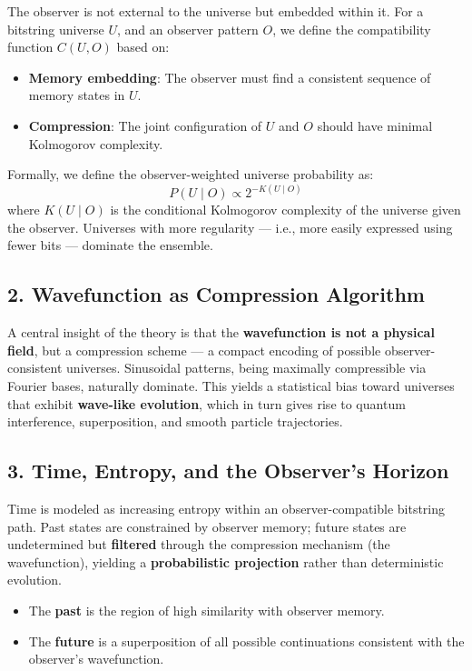 \documentclass[11pt]{article}
\begin{document}
The observer is not external to the universe but embedded within it. For a bitstring universe $U$, and an observer pattern $O$, we define the compatibility function $C(U, O)$ based on:

\begin{itemize}
      \item \textbf{Memory embedding}: The observer must find a consistent sequence of memory states in $U$.
      \item \textbf{Compression}: The joint configuration of $U$ and $O$ should have minimal Kolmogorov complexity.
\end{itemize}

Formally, we define the observer-weighted universe probability as:
\[
      P(U \mid O) \propto 2^{-K(U \mid O)}
\]
where $K(U \mid O)$ is the conditional Kolmogorov complexity of the universe given the observer. Universes with more regularity — i.e., more easily expressed using fewer bits — dominate the ensemble.

\subsection*{2. Wavefunction as Compression Algorithm}

A central insight of the theory is that the \textbf{wavefunction is not a physical field}, but a compression scheme — a compact encoding of possible observer-consistent universes. Sinusoidal patterns, being maximally compressible via Fourier bases, naturally dominate. This yields a statistical bias toward universes that exhibit \textbf{wave-like evolution}, which in turn gives rise to quantum interference, superposition, and smooth particle trajectories.

\subsection*{3. Time, Entropy, and the Observer's Horizon}

Time is modeled as increasing entropy within an observer-compatible bitstring path. Past states are constrained by observer memory; future states are undetermined but \textbf{filtered} through the compression mechanism (the wavefunction), yielding a \textbf{probabilistic projection} rather than deterministic evolution.

\begin{itemize}
      \item The \textbf{past} is the region of high similarity with observer memory.
      \item The \textbf{future} is a superposition of all possible continuations consistent with the observer’s wavefunction.
\end{itemize}
\end{document}
